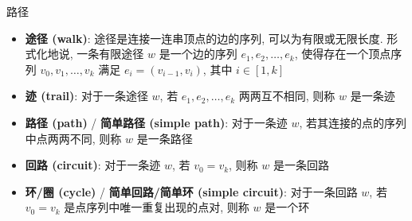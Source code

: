 \begin{frame}{路径}
	\begin{itemize}
		\item<1->\textbf{途径 (walk)}: 途径是连接一连串顶点的边的序列, 可以为有限或无限长度. 形式化地说, 一条有限途径 \(w\) 是一个边的序列 \(e_1, e_2, \ldots, e_k\), 使得存在一个顶点序列 \(v_0, v_1, \ldots, v_k\) 满足 \(e_i = (v_{i-1}, v_i)\), 其中 \(i \in [1, k]\)


		\item<4->\textbf{迹 (trail)}: 对于一条途径 \(w\), 若 \(e_1, e_2, \ldots, e_k\) 两两互不相同, 则称 \(w\) 是一条迹
		\item<5->\textbf{路径 (path)} / \textbf{简单路径 (simple path)}: 对于一条迹 \(w\), 若其连接的点的序列中点两两不同, 则称 \(w\) 是一条路径
		\item<6->\textbf{回路 (circuit)}: 对于一条迹 \(w\), 若 \(v_0 = v_k\), 则称 \(w\) 是一条回路
		\item<7->\textbf{环/圈 (cycle)} / \textbf{简单回路/简单环 (simple circuit)}: 对于一条回路 \(w\), 若 \(v_0 = v_k\) 是点序列中唯一重复出现的点对, 则称 \(w\) 是一个环
	\end{itemize}
\end{frame}
